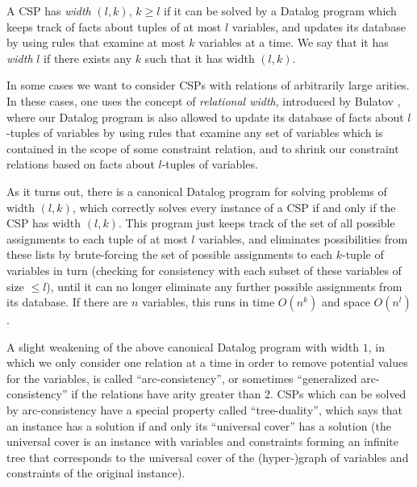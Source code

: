 \begin{defn} A CSP has \emph{width} $(l,k)$, $k \ge l$ if it can be solved by a Datalog program which keeps track of facts about tuples of at most $l$ variables, and updates its database by using rules that examine at most $k$ variables at a time. We say that it has \emph{width} $l$ if there exists any $k$ such that it has width $(l,k)$.
\end{defn}

In some cases we want to consider CSPs with relations of arbitrarily large arities. In these cases, one uses the concept of \emph{relational width}, introduced by Bulatov \cite{2-semilattice}, where our Datalog program is also allowed to update its database of facts about $l$-tuples of variables by using rules that examine any set of variables which is contained in the scope of some constraint relation, and to shrink our constraint relations based on facts about $l$-tuples of variables.

As it turns out, there is a canonical Datalog program for solving problems of width $(l,k)$, which correctly solves every instance of a CSP if and only if the CSP has width $(l,k)$. This program just keeps track of the set of all possible assignments to each tuple of at most $l$ variables, and eliminates possibilities from these lists by brute-forcing the set of possible assignments to each $k$-tuple of variables in turn (checking for consistency with each subset of these variables of size $\le l$), until it can no longer eliminate any further possible assignments from its database. If there are $n$ variables, this runs in time $O(n^k)$ and space $O(n^l)$.

A slight weakening of the above canonical Datalog program with width $1$, in which we only consider one relation at a time in order to remove potential values for the variables, is called ``arc-consistency'', or sometimes ``generalized arc-consistency'' if the relations have arity greater than $2$. CSPs which can be solved by arc-consistency have a special property called ``tree-duality'', which says that an instance has a solution if and only its ``universal cover'' has a solution (the universal cover is an instance with variables and constraints forming an infinite tree that corresponds to the universal cover of the (hyper-)graph of variables and constraints of the original instance).

